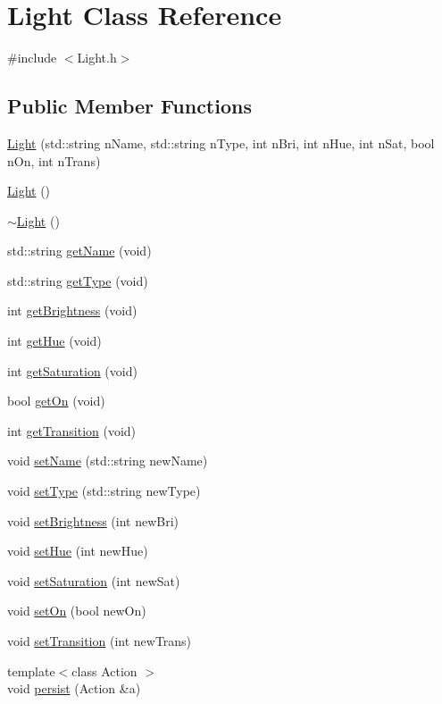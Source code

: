 \hypertarget{class_light}{}\section{Light Class Reference}
\label{class_light}


{\ttfamily \#include $<$Light.\+h$>$}

\subsection*{Public Member Functions}
\begin{DoxyCompactItemize}
\item 
\hyperlink{class_light_aaeb13d35d2c08e223ca32e8382e83452}{Light} (std\+::string n\+Name, std\+::string n\+Type, int n\+Bri, int n\+Hue, int n\+Sat, bool n\+On, int n\+Trans)
\item 
\hyperlink{class_light_aeb5df09a25a32f19fdffa761268ba24f}{Light} ()
\item 
\hyperlink{class_light_ad0e59fad13bb6cfadc25b2c477e9ddc7}{$\sim$\+Light} ()
\item 
std\+::string \hyperlink{class_light_a768a0219abfdc1684e90513995280b08}{get\+Name} (void)
\item 
std\+::string \hyperlink{class_light_a8dfd61470ed66935ef3ea2de76d7049a}{get\+Type} (void)
\item 
int \hyperlink{class_light_ad512a50c53993d50ef98731d7b1d6653}{get\+Brightness} (void)
\item 
int \hyperlink{class_light_abc39a64bfcc5b43088cefcd662956cb8}{get\+Hue} (void)
\item 
int \hyperlink{class_light_ab654f1c6ffbc3f79fc88d487449dd744}{get\+Saturation} (void)
\item 
bool \hyperlink{class_light_a4145a367202562504ccf4314f489d0eb}{get\+On} (void)
\item 
int \hyperlink{class_light_ab38069befb7f7ba10b8ee0cffaf89d57}{get\+Transition} (void)
\item 
void \hyperlink{class_light_acbb28a74fceea5fc98568b315e328eac}{set\+Name} (std\+::string new\+Name)
\item 
void \hyperlink{class_light_a9bc02e6694d481e938e2b9710fd3ff9f}{set\+Type} (std\+::string new\+Type)
\item 
void \hyperlink{class_light_a26ebe8e6574a11c2e2a50c00378a3cea}{set\+Brightness} (int new\+Bri)
\item 
void \hyperlink{class_light_a1120d4aff3fcb5a1df425f7d08224691}{set\+Hue} (int new\+Hue)
\item 
void \hyperlink{class_light_a81c65b7b6a3cb135a69591c0640cd5e9}{set\+Saturation} (int new\+Sat)
\item 
void \hyperlink{class_light_abebbcc06640fed324f219f97bbe9ebc8}{set\+On} (bool new\+On)
\item 
void \hyperlink{class_light_a2daccaa69755e4397a85a830c7caaba1}{set\+Transition} (int new\+Trans)
\item 
{\footnotesize template$<$class Action $>$ }\\void \hyperlink{class_light_a2c527298bf267abdca3b30d3ebbf785e}{persist} (Action \&a)
\end{DoxyCompactItemize}
